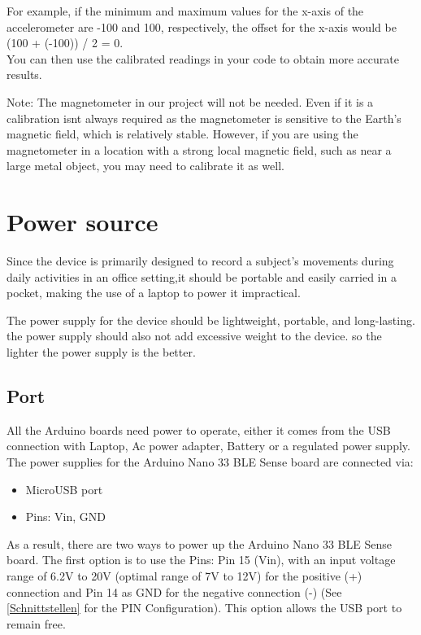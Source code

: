 For example, if the minimum and maximum values for the x-axis of the accelerometer are -100 and 100, respectively, the offset for the x-axis would be (100 + (-100)) / 2 = 0.\\

You can then use the calibrated readings in your code to obtain more accurate results.

Note: The magnetometer in our project will not be needed.
Even if it is a calibration isnt always required as the magnetometer is sensitive to the Earth's magnetic field, which is relatively stable. However, if you are using the magnetometer in a location with a strong local magnetic field, such as near a large metal object, you may need to calibrate it as well.

\section{Power source}

Since the device is primarily designed to record a subject's movements during daily activities in an office setting,it should be portable and easily carried in a pocket, making the use of a laptop to power it impractical. 

The power supply for the device should be lightweight, portable, and long-lasting.
the power supply should also not add excessive weight to the device. so the lighter the power supply is the better. 
\cite{Scherer:2022}
\subsection{Port}
All the Arduino boards need power to operate, either it comes from the USB connection with Laptop, Ac power adapter, Battery or a regulated power supply. \\

The power supplies for the Arduino Nano 33 BLE Sense board are connected via:

\begin{itemize}
	\item MicroUSB port
	\item Pins: Vin, GND
\end{itemize}

As a result, there are two ways to power up the Arduino Nano 33 BLE Sense board. The first option is to use the Pins: Pin 15 (Vin), with an input voltage range of 6.2V to 20V (optimal range of 7V to 12V) for the positive (+) connection and Pin 14 as GND for the negative connection (-) (See \ref{Schnittstellen} for the PIN Configuration). This option allows the USB port to remain free. \medskip



